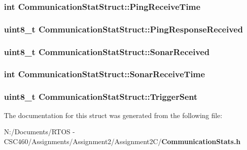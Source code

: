 \subsubsection{\setlength{\rightskip}{0pt plus 5cm}int {\bf Communication\-Stat\-Struct::Ping\-Receive\-Time}}\label{struct_communication_stat_struct_4057493944450ee760539efb045d503b}


\subsubsection{\setlength{\rightskip}{0pt plus 5cm}uint8\_\-t {\bf Communication\-Stat\-Struct::Ping\-Response\-Received}}\label{struct_communication_stat_struct_a856c49b68f2b723d5773de5d6bc2ddd}


\subsubsection{\setlength{\rightskip}{0pt plus 5cm}uint8\_\-t {\bf Communication\-Stat\-Struct::Sonar\-Received}}\label{struct_communication_stat_struct_91fdcd3d33786dc39d30937d61c1f689}


\subsubsection{\setlength{\rightskip}{0pt plus 5cm}int {\bf Communication\-Stat\-Struct::Sonar\-Receive\-Time}}\label{struct_communication_stat_struct_806a74553fd538ce190a046a40a5d114}


\subsubsection{\setlength{\rightskip}{0pt plus 5cm}uint8\_\-t {\bf Communication\-Stat\-Struct::Trigger\-Sent}}\label{struct_communication_stat_struct_12bb1408fe5b557ced2338651e2a5ce5}




The documentation for this struct was generated from the following file:\begin{CompactItemize}
\item 
N:/Documents/RTOS - CSC460/Assignments/Assignment2/Assignment2C/{\bf Communication\-Stats.h}\end{CompactItemize}
